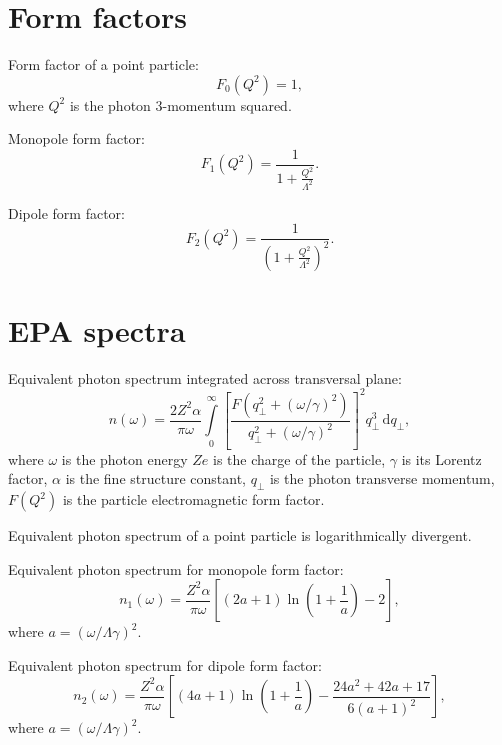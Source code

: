 \documentclass[a4paper,12pt]{article}
\begin{document}
\section{Form factors}

Form factor of a point particle:
\begin{equation}
  F_0(Q^2) = 1,
\end{equation}
where $Q^2$ is the photon 3-momentum squared.

Monopole form factor:
\begin{equation}
  F_1(Q^2) = \frac{1}{1 + \frac{Q^2}{\Lambda^2}}.
\end{equation}

Dipole form factor:
\begin{equation}
  F_2(Q^2) = \frac{1}{\left( 1 + \frac{Q^2}{\Lambda^2} \right)^2}.
\end{equation}

\section{EPA spectra}

Equivalent photon spectrum integrated across transversal plane:
\begin{equation}
  n(\omega)
  = \frac{2 Z^2 \alpha}{\pi \omega}
    \int\limits_0^\infty
      \left[
        \frac{F(q_\perp^2 + (\omega / \gamma)^2)}
             {q_\perp^2 + (\omega / \gamma)^2}
      \right]^2
      q_\perp^3
      \, \mathrm{d} q_\perp,
  \label{spectrum}
\end{equation}
where $\omega$ is the photon energy $Z e$ is the charge of the particle,
$\gamma$ is its Lorentz factor, $\alpha$ is the fine structure constant,
$q_\perp$ is the photon transverse momentum, $F(Q^2)$ is the particle
electromagnetic form factor.

Equivalent photon spectrum of a point particle is logarithmically divergent.

Equivalent photon spectrum for monopole form factor:
\begin{equation}
  n_1(\omega)
  = \frac{Z^2 \alpha}{\pi \omega}
    \left[ (2 a + 1) \ln \left(1 + \frac{1}{a} \right) - 2 \right],
\end{equation}
where $a = (\omega / \Lambda \gamma)^2$.

Equivalent photon spectrum for dipole form factor:
\begin{equation}
  n_2(\omega)
  = \frac{Z^2 \alpha}{\pi \omega}
    \left[
      (4 a + 1) \ln \left(1 + \frac{1}{a} \right)
      - \frac{24 a^2 + 42 a + 17}{6 (a + 1)^2}
    \right],
\end{equation}
where $a = (\omega / \Lambda \gamma)^2$.
\end{document}
